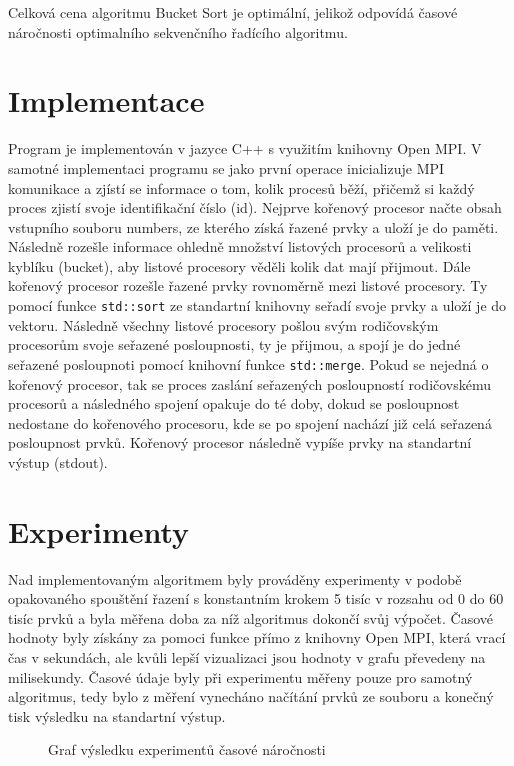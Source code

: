 \documentclass[12pt, a4paper]{article}
\begin{document}
Celková cena algoritmu Bucket Sort je optimální, jelikož odpovídá časové náročnosti optimalního sekvenčního řadícího algoritmu.

\section{Implementace}
Program je implementován v jazyce C++ s využitím knihovny Open MPI. V samotné implementaci programu se jako první operace inicializuje MPI komunikace a zjístí se informace o tom, kolik procesů běží, přičemž si každý proces zjistí svoje identifikační číslo (id). Nejprve kořenový procesor načte obsah vstupního souboru numbers, ze kterého získá řazené prvky a uloží je do paměti. Následně rozešle informace ohledně množství listových procesorů a velikosti kyblíku (bucket), aby listové procesory věděli kolik dat mají přijmout. Dále kořenový procesor rozešle řazené prvky rovnoměrně mezi listové procesory. Ty pomocí funkce \texttt{std::sort} ze standartní knihovny seřadí svoje prvky a uloží je do vektoru. Následně všechny listové procesory pošlou svým rodičovským procesorům svoje seřazené posloupnosti, ty je přijmou, a spojí je do jedné seřazené posloupnoti pomocí knihovní funkce \texttt{std::merge}. Pokud se nejedná o kořenový procesor, tak se proces zaslání seřazených posloupností rodičovskému procesorů a následného spojení opakuje do té doby, dokud se posloupnost nedostane do kořenového procesoru, kde se po spojení nachází již celá seřazená posloupnost prvků. Kořenový procesor následně vypíše prvky na standartní výstup (stdout).

\section{Experimenty}
Nad implementovaným algoritmem byly prováděny experimenty v podobě opakovaného spouštění řazení s konstantním krokem 5 tisíc v rozsahu od 0 do 60 tisíc prvků a byla měřena doba za níž algoritmus dokončí svůj výpočet. Časové hodnoty byly získány za pomoci funkce přímo z knihovny Open MPI, která vrací čas v sekundách, ale kvůli lepší vizualizaci jsou hodnoty v grafu převedeny na milisekundy. Časové údaje byly při experimentu měřeny pouze pro samotný algoritmus, tedy bylo z měření vynecháno načítání prvků ze souboru a konečný tisk výsledku na standartní výstup.


\begin{figure}[h]\centering
	\label{fig:experimenty}
	\caption{Graf výsledku experimentů časové náročnosti}	
\end{figure}
\end{document}
